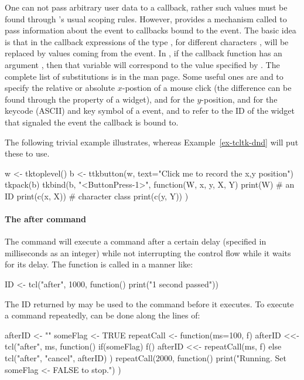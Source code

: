 One can not pass arbitrary user data to a callback, rather such values
must be found through \R's usual scoping rules. However, \TK\/
provides a mechanism called  to pass
information about the event to callbacks bound to the event. The basic
idea is that in the \TCL\/ callback expressions of the type
, for different characters , will be replaced by values
coming from the event. In , if the callback function has an
argument , then that variable will correspond to the value
specified by . The complete list of substitutions is in the
 man page. Some useful ones are  and  to
specify the relative or absolute $x$-postion of a mouse click (the
difference can be found through the  property of a
widget),  and  for the $y$-position,  and
 for the keycode (ASCII) and key symbol of a
 event, and  to refer to the ID of the
widget that signaled the event the callback is bound
to. 

The following trivial example illustrates, whereas
Example~\ref{ex-tcltk-dnd} will put these to use.

\begin{Schunk}
\begin{Sinput}
 w <- tktoplevel()
 b <- ttkbutton(w, text="Click me to record the x,y position")
 tkpack(b)
 tkbind(b, "<ButtonPress-1>", function(W, x, y, X, Y) {
   print(W)                              # an ID
   print(c(x, X))                        # character class
   print(c(y, Y))
   })
\end{Sinput}
\end{Schunk}




\paragraph{The after command}
The \TCL\/ command  will execute a command after a certain
delay (specified in milliseconds as an integer) while not interrupting
the control flow while it waits for its delay. The function is called
in a manner like:
\begin{Schunk}
  \begin{Sinput}
ID <- tcl("after", 1000, function() print("1 second passed"))    
  \end{Sinput}
\end{Schunk}
The ID returned by  may be used to  the
command before it executes. To execute a command repeatedly, can be
done along the lines of:
\begin{Schunk}
\begin{Sinput}
 afterID <- ""
 someFlag <- TRUE
 repeatCall <- function(ms=100, f) {
   afterID <<- tcl("after", ms, function() {
     if(someFlag) {                      
       f()
       afterID <<- repeatCall(ms, f)
     }  else {
       tcl("after", "cancel", afterID)
     }
   })
 }
 repeatCall(2000, function() {
   print("Running. Set someFlag <- FALSE to stop.")
 })
\end{Sinput}
\end{Schunk}
%


